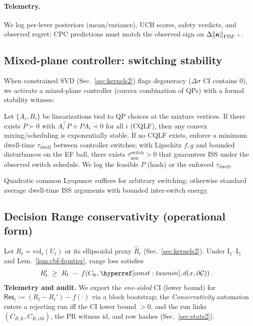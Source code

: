 \paragraph{Telemetry.}
We log per-lever posteriors (mean/variance), UCB scores, safety verdicts, and observed regret; CPC predictions must match the observed sign on $\Delta\|\bm\kappa\|_{\mathrm{FIM}^{-1}}$.

\subsection*{Mixed-plane controller: switching stability}
When constrained SVD (Sec.~\ref{sec:kernels2}) flags degeneracy ($\Delta\sigma$ CI contains $0$), we activate a mixed-plane controller (convex combination of QPs) with a formal stability witness:

\begin{theorem}\label{thm:switch-stab}
\emph{}
Let $\{A_i,B_i\}$ be linearizations tied to QP choices at the mixture vertices. If there exists $P\succ 0$ with $A_i^\top P+P A_i \prec 0$ for all $i$ (CQLF), then any convex mixing/scheduling is exponentially stable. If no CQLF exists, enforce a minimum dwell-time $\tau_{\mathrm{dwell}}$ between controller switches; with Lipschitz $f,g$ and bounded disturbances on the EF ball, there exists $\tau_{\min}^{\mathrm{switch}}>0$ that guarantees ISS under the observed switch schedule. We log the feasible $P$ (hash) or the enforced $\tau_{\mathrm{dwell}}$.
\begin{proofsketch}
Quadratic common Lyapunov suffices for arbitrary switching; otherwise standard average dwell-time ISS arguments with bounded inter-switch energy.
\end{proofsketch}
\end{theorem}

\subsection*{Decision Range conservativity (operational form)}
Let $R_t=\mathrm{vol}_r(U_t)$ or its ellipsoidal proxy $\widehat R_t$ (Sec.~\ref{sec:kernels2}). Under I$_1$–I$_5$ and Lem.~\ref{lem:cbf-frontier}, range loss satisfies
\[
R_t' \ \ge\ R_t\;-\;f\!\left(C_{\mathrm{fr}},\constref{taumin},d(x,\partial\mathcal C)\right).
\]
\textbf{Telemetry and audit.} We export the \emph{one-sided} CI (lower bound) for
\(
\mathsf{Res}_t:=(R_t-R_t')-f(\cdot)
\)
via a block bootstrap; the \emph{Conservativity} automaton enters a rejecting run iff the CI lower bound $>0$, and the run links $(C_{R,\mathrm{fr}},C_{R,\mathrm{cbf}})$, the PR witness id, and row hashes (Sec.~\ref{sec:stats2}).

